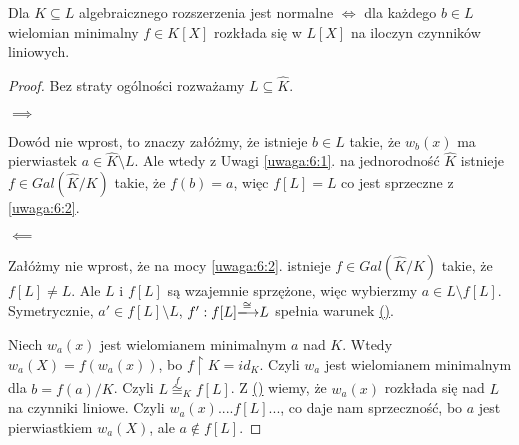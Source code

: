 \begin{theorem}
Dla $K\subseteq L$ algebraicznego rozszerzenia jest normalne $\iff$ dla każdego $b\in L$ wielomian minimalny $f\in K[X]$ rozkłada się w $L[X]$ na iloczyn czynników liniowych.
\end{theorem}
\begin{proof}
Bez straty ogólności rozważamy $L\subseteq\hat{K}$. 

$\implies$ 

Dowód nie wprost, to znaczy załóżmy, że istnieje $b\in L$ takie, że $w_b(x)$ ma pierwiastek $a\in \hat{K}\setminus L$. Ale wtedy z Uwagi \ref{uwaga:6:1}. na jednorodność $\hat{K}$ istnieje $f\in Gal(\hat{K}/K)$ takie, że $f(b)=a$, więc $f[L]=L$ co jest sprzeczne z \ref{uwaga:6:2}.

$\impliedby$

Załóżmy nie wprost, że na mocy \ref{uwaga:6:2}. istnieje $f\in Gal(\hat{K}/K)$ takie, że $f[L]\neq L$. Ale $L$ i $f[L]$ są wzajemnie sprzężone, więc wybierzmy $a\in L\setminus f[L]$. Symetrycznie, $a'\in f[L]\setminus L$, $f':f[L]\isomorphism L$ spełnia warunek \hyperref[aaaa]{{\color{yellow}(\Coffeecup)}}.

Niech $w_a(x)$ jest wielomianem minimalnym $a$ nad $K$. Wtedy $w_a(X)=f(w_a(x))$, bo $f\restriction K=id_K$. Czyli $w_a$ jest wielomianem minimalnym dla $b=f(a)/K$. Czyli $L\overset{f}{\cong}_Kf[L]$. Z \hyperref[aaaa]{{\color{yellow}(\Coffeecup)}} wiemy, że $w_a(x)$ rozkłada się nad $L$ na czynniki liniowe. Czyli $w_a(x)....f[L]...$, co daje nam sprzeczność, bo $a$ jest pierwiastkiem $w_a(X)$, ale $a\notin f[L]$.

\end{proof}




































